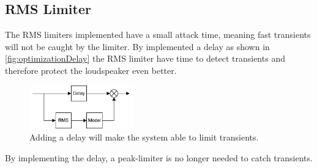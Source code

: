 \subsection*{RMS Limiter}
The RMS limiters implemented have a small attack time, meaning fast transients will not be caught by the limiter. By implemented a delay as shown in \autoref{fig:optimizationDelay} the RMS limiter have time to detect transients and therefore protect the loudspeaker even better. 
\begin{figure}[H]
\centering
\includegraphics[width=0.4\textwidth]{figures/optimizationDelay.pdf}
\caption{Adding a delay will make the system able to limit transients.}
\label{fig:optimizationDelay}
\end{figure}
By implementing the delay, a peak-limiter is no longer needed to catch transients.



